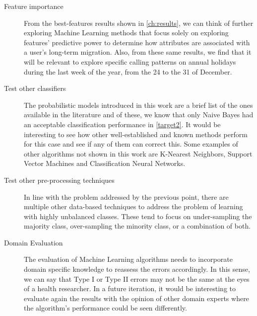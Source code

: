 \begin{description}
    \item [Feature importance] From the best-features results shown in \cref{ch:results}, we can think of further exploring Machine Learning methods that focus solely on exploring features' predictive power to determine how attributes are associated with a user's long-term migration.
    Also, from these same results, we find that it will be relevant to explore specific calling patterns on annual holidays during the last week of the year, from the 24 to the 31 of December.

    \item [Test other classifiers] The probabilistic models introduced in this work are a brief list of the ones available in the literature and of these, we know that only Naive Bayes had an acceptable classification performance in \cref{target2}.
    It would be interesting to see how other well-established and known methods perform for this case and see if any of them can correct this.
    Some examples of other algorithms not shown in this work are K-Nearest Neighbors, Support Vector Machines and Classification Neural Networks.

    \item [Test other pre-processing techniques] In line with the problem addressed by the previous point, there are multiple other data-based techniques to address the problem of learning with highly unbalanced classes.
    These tend to focus on under-sampling the majority class, over-sampling the minority class, or a combination of both.


    \item [Domain Evaluation] The evaluation of Machine Learning algorithms needs to incorporate domain specific knowledge to reassess the errors accordingly. In this sense, we can say that Type I or Type II errors may not be the same at the eyes of a health researcher.
    In a future iteration, it would be interesting to evaluate again the results with the opinion of other domain experts where the algorithm's performance could be seen differently.

\end{description}

